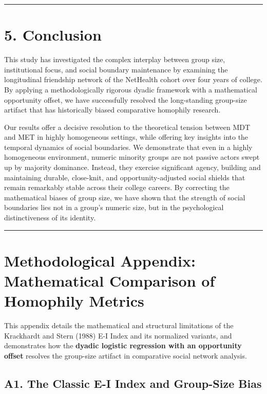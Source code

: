 \documentclass[
  letterpaper,
  DIV=11,
  numbers=noendperiod]{scrartcl}
\begin{document}
\begin{center}\rule{0.5\linewidth}{0.5pt}\end{center}

\section{5. Conclusion}\label{conclusion}

This study has investigated the complex interplay between group size,
institutional focus, and social boundary maintenance by examining the
longitudinal friendship network of the NetHealth cohort over four years
of college. By applying a methodologically rigorous dyadic framework
with a mathematical opportunity offset, we have successfully resolved
the long-standing group-size artifact that has historically biased
comparative homophily research.

Our results offer a decisive resolution to the theoretical tension
between MDT and MET in highly homogeneous settings, while offering key
insights into the temporal dynamics of social boundaries. We demonstrate
that even in a highly homogeneous environment, numeric minority groups
are not passive actors swept up by majority dominance. Instead, they
exercise significant agency, building and maintaining durable,
close-knit, and opportunity-adjusted social shields that remain
remarkably stable across their college careers. By correcting the
mathematical biases of group size, we have shown that the strength of
social boundaries lies not in a group's numeric size, but in the
psychological distinctiveness of its identity.

\begin{center}\rule{0.5\linewidth}{0.5pt}\end{center}

\section{Methodological Appendix: Mathematical Comparison of Homophily
Metrics}\label{methodological-appendix-mathematical-comparison-of-homophily-metrics}

This appendix details the mathematical and structural limitations of the
Krackhardt and Stern (1988) E-I Index and its normalized variants, and
demonstrates how the \textbf{dyadic logistic regression with an
opportunity offset} resolves the group-size artifact in comparative
social network analysis.

\subsection{A1. The Classic E-I Index and Group-Size
Bias}\label{a1.-the-classic-e-i-index-and-group-size-bias}
\end{document}
